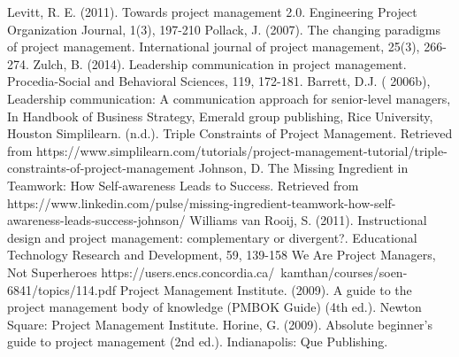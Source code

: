 \documentclass[11pt]{article}
\begin{document}
\begin{thebibliography}{10}
    Levitt, R. E. (2011). Towards project management 2.0. Engineering Project Organization Journal, 1(3), 197-210
     Pollack, J. (2007). The changing paradigms of project management. International journal of project management, 25(3), 266-274.
     Zulch, B. (2014). Leadership communication in project management. Procedia-Social and Behavioral Sciences, 119, 172-181.
     Barrett, D.J. ( 2006b), Leadership communication: A communication approach for senior-level managers, In Handbook of Business Strategy, Emerald group publishing, Rice University, Houston
     Simplilearn. (n.d.). Triple Constraints of Project Management. Retrieved from https://www.simplilearn.com/tutorials/project-management-tutorial/triple-constraints-of-project-management
     Johnson, D. The Missing Ingredient in Teamwork: How Self-awareness Leads to Success. Retrieved from https://www.linkedin.com/pulse/missing-ingredient-teamwork-how-self-awareness-leads-success-johnson/
     Williams van Rooij, S. (2011). Instructional design and project management: complementary or divergent?. Educational Technology Research and Development, 59, 139-158
    We Are Project Managers, Not Superheroes 
    https://users.encs.concordia.ca/~kamthan/courses/soen-6841/topics/114.pdf
     Project Management Institute. (2009). A guide to the project management body of knowledge (PMBOK Guide) (4th ed.). Newton Square: Project Management Institute.
     Horine, G. (2009). Absolute beginner’s guide to project management (2nd ed.). Indianapolis: Que Publishing.
\end{thebibliography}
\end{document}
